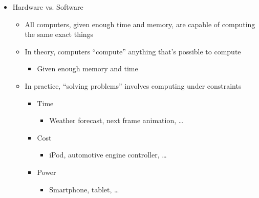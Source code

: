 \begin{itemize}
\begin{itemize}
    \end{itemize}

  \item Hardware vs. Software

    \begin{itemize}

      \item All computers, given enough time and memory, are capable of computing the same exact things

      \item In theory, computers ``compute'' anything that's possible to compute

        \begin{itemize}

          \item Given enough memory and time

        \end{itemize}

      \item In practice, ``solving problems'' involves computing under constraints

        \begin{itemize}

          \item Time

            \begin{itemize}

              \item Weather forecast, next frame animation, \ldots

            \end{itemize}

          \item Cost

            \begin{itemize}

              \item iPod, automotive engine controller, \ldots

            \end{itemize}

          \item Power

            \begin{itemize}

              \item Smartphone, tablet, \ldots

            \end{itemize}


\end{itemize}
\end{itemize}
\end{itemize}
